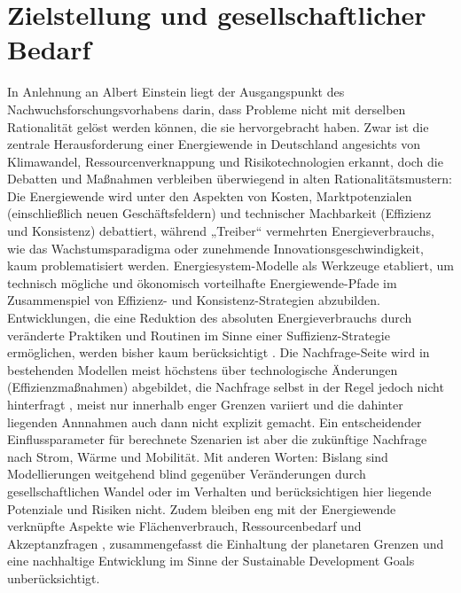 \documentclass[a4paper,11pt,twoside]{scrartcl}
\begin{document}
\onehalfspacing

\clearpage


{\singlespacing

}

\setcounter{page}{1}

\section{Zielstellung und gesellschaftlicher Bedarf}
\label{sec:ziel}

In Anlehnung an Albert Einstein liegt der Ausgangspunkt des Nachwuchsforschungsvorhabens darin, dass Probleme nicht mit derselben Rationalität gelöst werden können, die sie hervorgebracht haben. Zwar ist die zentrale Herausforderung einer Energiewende in Deutschland angesichts von Klimawandel, Ressourcenverknappung und Risikotechnologien erkannt, doch die Debatten und Maßnahmen verbleiben überwiegend in alten Rationalitätsmustern: Die Energiewende wird unter den Aspekten von Kosten, Marktpotenzialen (einschließlich neuen Geschäftsfeldern) und technischer Machbarkeit (Effizienz und Konsistenz) debattiert, während „Treiber“ vermehrten Energieverbrauchs, wie das Wachstumsparadigma oder zunehmende Innovationsgeschwindigkeit, kaum problematisiert werden. Energiesystem-Modelle als Werkzeuge etabliert, um technisch mögliche und ökonomisch vorteilhafte Energiewende-Pfade im Zusammenspiel von Effizienz- und Konsistenz-Strategien abzubilden. Entwicklungen, die eine Reduktion des absoluten Energieverbrauchs durch veränderte Praktiken und Routinen im Sinne einer Suffizienz-Strategie ermöglichen, werden bisher kaum berücksichtigt \cite{SAMADI2017}. Die Nachfrage-Seite wird in bestehenden Modellen meist höchstens über technologische Änderungen (Effizienzmaßnahmen) abgebildet, die Nachfrage selbst in der Regel jedoch nicht hinterfragt \cite{Creutzig2018}, meist nur innerhalb enger Grenzen variiert und die dahinter liegenden Annnahmen auch dann nicht explizit gemacht. Ein entscheidender Einflussparameter für berechnete Szenarien ist aber die zukünftige Nachfrage nach Strom, Wärme und Mobilität. Mit anderen Worten: Bislang sind Modellierungen weitgehend blind gegenüber Veränderungen durch gesellschaftlichen Wandel oder im Verhalten und berücksichtigen hier liegende Potenziale und Risiken nicht. Zudem bleiben eng mit der Energiewende verknüpfte Aspekte wie Flächenverbrauch, Ressourcenbedarf \cite{Mocker2015,Buchert2011} und Akzeptanzfragen \cite{Fuchs2016}, zusammengefasst die Einhaltung der planetaren Grenzen \cite{Rockstroem2009} und eine nachhaltige Entwicklung im Sinne der Sustainable Development Goals \cite{UN_SDG} unberücksichtigt.\\
\end{document}

